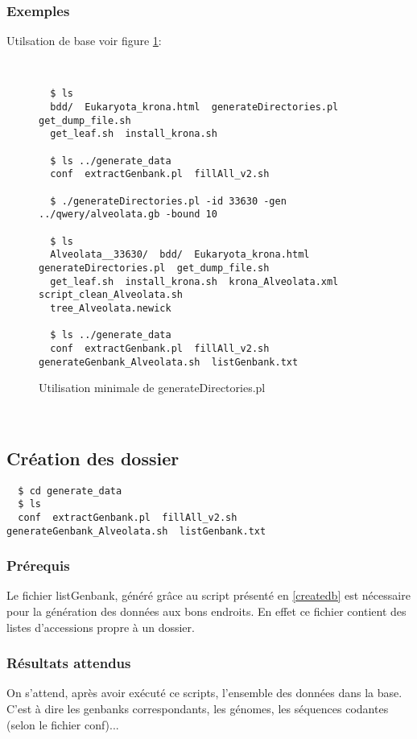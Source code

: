 \subsubsection{Exemples}

Utilsation de base voir figure \ref{gd}:

~\\
\begin{figure}[H]

\begin{center}
\begin{verbatim}
  $ ls
  bdd/  Eukaryota_krona.html  generateDirectories.pl  get_dump_file.sh  
  get_leaf.sh  install_krona.sh 
  
  $ ls ../generate_data 
  conf  extractGenbank.pl  fillAll_v2.sh
  
  $ ./generateDirectories.pl -id 33630 -gen ../qwery/alveolata.gb -bound 10
  
  $ ls 
  Alveolata__33630/  bdd/  Eukaryota_krona.html  generateDirectories.pl  get_dump_file.sh  
  get_leaf.sh  install_krona.sh  krona_Alveolata.xml  script_clean_Alveolata.sh  
  tree_Alveolata.newick
  
  $ ls ../generate_data 
  conf  extractGenbank.pl  fillAll_v2.sh	generateGenbank_Alveolata.sh  listGenbank.txt
  \end{verbatim}
\end{center}
\caption{\label{gd}Utilisation minimale de generateDirectories.pl}
\end{figure}
~\\



\subsection{Création des dossier}
\label{generatedata}
\begin{verbatim}
  $ cd generate_data
  $ ls
  conf  extractGenbank.pl  fillAll_v2.sh	generateGenbank_Alveolata.sh  listGenbank.txt
\end{verbatim}

\subsubsection{Prérequis}
Le fichier listGenbank, généré grâce au script présenté en \ref{createdb} est nécessaire 
pour la génération des données aux bons endroits. En effet ce fichier contient des listes d'accessions propre
à un dossier.

\subsubsection{Résultats attendus}
On s'attend, après avoir exécuté ce scripts, l'ensemble des données dans la base. C'est à dire
les genbanks correspondants, les génomes, les séquences codantes (selon le fichier conf)...

